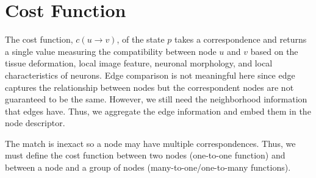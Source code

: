 \documentclass{article}
\begin{document}
\section{Cost Function} \label{sec:cost}
The cost function, $c(u \rightarrow v)$, of the state $p$ takes a correspondence and returns a single value measuring the compatibility between node $u$ and $v$ based on the tissue deformation, local image feature, neuronal morphology, and local characteristics of neurons. Edge comparison is not meaningful here since edge captures the relationship between nodes but the correspondent nodes are not guaranteed to be the same. However, we still need the neighborhood information that edges have. Thus, we aggregate the edge information and embed them in the node descriptor. 

The match is inexact so a node may have multiple correspondences. Thus, we must define the cost function between two nodes (one-to-one function) and between a node and a group of nodes (many-to-one/one-to-many functions).
\end{document}
